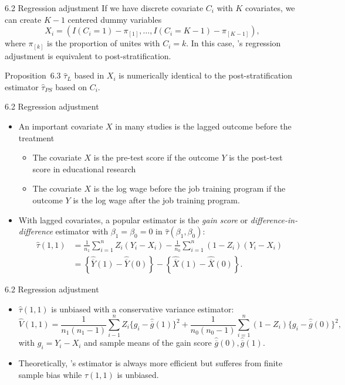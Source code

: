 \documentclass[aspectratio=169, 12pt]{beamer}
\begin{document}
\begin{frame}[label=prop-6-3]{6.2 Regression adjustment}
  If we have discrete covariate $C_i$ with $K$ covariates, we can create $K-1$ centered dummy variables
  \[
  X_i = (I(C_i=1)-\pi_{[1]},\dots,I(C_i=K-1)-\pi_{[K-1]}),
  \]
  where $\pi_{[k]}$ is the proportion of unites with $C_i=k$. In this case, \citet{lin2013agnostic}'s regression adjustment is equivalent to post-stratification.
  
  \begin{keybox}{Proposition~6.3}
    $\widehat{\tau}_L$ based in $X_i$ is numerically identical to the post-stratification estimator $\widehat{\tau}_{PS}$ based on $C_i$.
  \end{keybox}
  \vfill
  \hfill\hyperlink{pr-prop-6-3<1>}{}
\end{frame}

\begin{frame}{6.2 Regression adjustment}
  \begin{itemize}
    \item An important covariate $X$ in many studies is the lagged outcome before the treatment
    \begin{itemize}
      \item The covariate $X$ is the pre-test score if the outcome $Y$ is the post-test score in educational research
      \item The covariate $X$ is the log wage before the job training program if the outcome $Y$ is the log wage after the job training program.
     \end{itemize}
     \item With lagged covariates, a popular estimator is the \textit{gain score} or \textit{difference-in-difference} estimator with $\beta_1=\beta_0=0$ in $\widehat{\tau}(\beta_1,\beta_0)$:
     \begin{align*}
      \widehat{\tau}(1,1)
      &=\frac{1}{n_1}\sum_{i=1}^{n}Z_i(Y_i-X_i)-\frac{1}{n_0}\sum_{i=1}^{n}(1-Z_i)(Y_i-X_i)\\
      &=\left\{\widehat{\overline{Y}}(1)-\widehat{\overline{Y}}(0)\right\}-\left\{\widehat{\overline{X}}(1)-\widehat{\overline{X}}(0)\right\}.
     \end{align*}
  \end{itemize}
\end{frame}

\begin{frame}{6.2 Regression adjustment}
  \begin{itemize}
    \item $\widehat{\tau}(1,1)$ is unbiased with a conservative variance estimator:
    \[
    \widehat{V}(1,1)=\frac{1}{n_1(n_1-1)}\sum_{i-1}^{n}Z_i\{g_i-\widehat{\overline{g}}(1)\}^2+\frac{1}{n_0(n_0-1)}\sum_{i=1}^{n}(1-Z_i)\{g_i-\widehat{\overline{g}}(0)\}^2,
    \]
    with $g_i=Y_i-X_i$ and sample means of the gain score $\widehat{\overline{g}}(0),\widehat{\overline{g}}(1)$.
    \item Theoretically, \citet{lin2013agnostic}'s estimator is always more efficient but sufferes from finite sample bias while $\widehat{\tau}(1,1)$ is unbiased.
  \end{itemize}
\end{frame}
\end{document}
